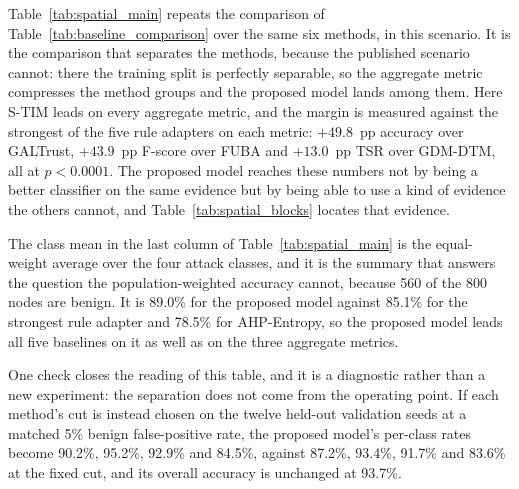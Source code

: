 \documentclass[notspecified,article,submit,moreauthors]{Definitions/mdpi}
\begin{document}
Table~\ref{tab:spatial_main} repeats the comparison of Table~\ref{tab:baseline_comparison} over the same six methods, in this scenario. It is the comparison that separates the methods, because the published scenario cannot: there the training split is perfectly separable, so the aggregate metric compresses the method groups and the proposed model lands among them. Here S-TIM leads on every aggregate metric, and the margin is measured against the strongest of the five rule adapters on each metric: $+49.8$~pp accuracy over GALTrust, $+43.9$~pp F-score over FUBA and $+13.0$~pp TSR over GDM-DTM, all at $p<0.0001$. The proposed model reaches these numbers not by being a better classifier on the same evidence but by being able to use a kind of evidence the others cannot, and Table~\ref{tab:spatial_blocks} locates that evidence.

The class mean in the last column of Table~\ref{tab:spatial_main} is the equal-weight average over the four attack classes, and it is the summary that answers the question the population-weighted accuracy cannot, because 560 of the 800 nodes are benign. It is 89.0\% for the proposed model against 85.1\% for the strongest rule adapter and 78.5\% for AHP-Entropy, so the proposed model leads all five baselines on it as well as on the three aggregate metrics.

One check closes the reading of this table, and it is a diagnostic rather than a new experiment: the separation does not come from the operating point. If each method's cut is instead chosen on the twelve held-out validation seeds at a matched 5\% benign false-positive rate, the proposed model's per-class rates become 90.2\%, 95.2\%, 92.9\% and 84.5\%, against 87.2\%, 93.4\%, 91.7\% and 83.6\% at the fixed cut, and its overall accuracy is unchanged at 93.7\%.
\end{document}
